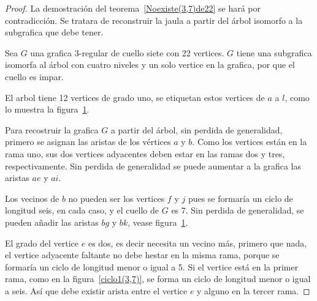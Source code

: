 \documentclass[12pt]{book}
\theoremstyle{definition}
\begin{document}
\begin{proof} La demostración del teorema~\ref{Noexiste(3,7)de22} se
  hará por contradicción. Se tratara de reconstruir la jaula a partir
  del árbol isomorfo a la subgrafica que debe tener.

Sea $G$ una grafica 3-regular de cuello siete con 22 vertices. $G$
tiene una subgrafica isomorfa al árbol con cuatro niveles y un solo
vertice en la grafica, por que el cuello es impar.

El arbol tiene 12 vertices de grado uno, se etiquetan estos vertices
de $a$ a $l$, como lo muestra la figura~\ref{arbol(3,7)}. 

Para recostruir la grafica $G$ a partir del árbol, sin perdida de generalidad, primero se asignan las aristas de los
vértices $a$ y $b$. Como los vertices están en la rama uno, sus dos
vertices adyacentes deben estar en las ramas dos y tres,
respectivamente. Sin perdida de generalidad se puede aumentar a la
grafica las aristas $ae$ y $ai$. 

Los vecinos de $b$ no pueden ser los vertices $f$ y $j$ pues se
formaría un ciclo de longitud seis, en cada caso, y el cuello de $G$
es 7. Sin perdida de
generalidad, se pueden añadir las aristas $bg$ y $bk$, vease figura~\ref{arbol(3,7)}.

\begin{figure}
  \centering
  \caption{} \label{arbol(3,7)}
\end{figure}

El grado del vertice $e$  es dos, es decir necesita un
vecino más, primero que nada, el vertice adyacente faltante no debe
hestar en la misma rama, porque se formaría un ciclo de longitud
menor o igual a 5. Si el vertice está en la primer rama, como en la
figura~\ref{ciclo1(3,7)}, se forma un ciclo de longitud menor o igual
a seis. Así que debe existir arista entre el vertice $e$ y alguno en
la tercer rama.


\end{proof}
\end{document}
